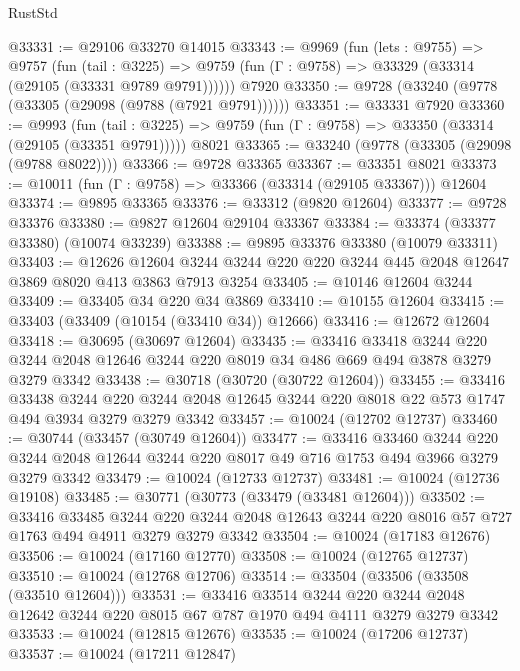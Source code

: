 \begin{lexlean}{RustStd}
\begin{coremodule}
@33331 := @29106 @33270 @14015
@33343 := @9969
    (fun (lets : @9755) =>
    @9757
      (fun (tail : @3225) =>
      @9759 (fun (Γ : @9758) => @33329 (@33314 (@29105 (@33331 @9789 @9791))))))
    @7920
@33350 := @9728 (@33240 (@9778 (@33305 (@29098 (@9788 (@7921 @9791))))))
@33351 := @33331 @7920
@33360 := @9993
    (fun (tail : @3225) => @9759 (fun (Γ : @9758) => @33350 (@33314 (@29105 (@33351 @9791)))))
    @8021
@33365 := @33240 (@9778 (@33305 (@29098 (@9788 @8022))))
@33366 := @9728 @33365
@33367 := @33351 @8021
@33373 := @10011 (fun (Γ : @9758) => @33366 (@33314 (@29105 @33367))) @12604
@33374 := @9895 @33365
@33376 := @33312 (@9820 @12604)
@33377 := @9728 @33376
@33380 := @9827 @12604 @29104 @33367
@33384 := @33374 (@33377 @33380) (@10074 @33239)
@33388 := @9895 @33376 @33380 (@10079 @33311)
@33403 := @12626
    @12604
    @3244
    @3244
    @220
    @220
    @3244
    @445
    @2048
    @12647
    @3869
    @8020
    @413
    @3863
    @7913
    @3254
@33405 := @10146 @12604 @3244
@33409 := @33405 @34 @220 @34 @3869
@33410 := @10155 @12604
@33415 := @33403 (@33409 (@10154 (@33410 @34)) @12666)
@33416 := @12672 @12604
@33418 := @30695 (@30697 @12604)
@33435 := @33416
    @33418
    @3244
    @220
    @3244
    @2048
    @12646
    @3244
    @220
    @8019
    @34
    @486
    @669
    @494
    @3878
    @3279
    @3279
    @3342
@33438 := @30718 (@30720 (@30722 @12604))
@33455 := @33416
    @33438
    @3244
    @220
    @3244
    @2048
    @12645
    @3244
    @220
    @8018
    @22
    @573
    @1747
    @494
    @3934
    @3279
    @3279
    @3342
@33457 := @10024 (@12702 @12737)
@33460 := @30744 (@33457 (@30749 @12604))
@33477 := @33416
    @33460
    @3244
    @220
    @3244
    @2048
    @12644
    @3244
    @220
    @8017
    @49
    @716
    @1753
    @494
    @3966
    @3279
    @3279
    @3342
@33479 := @10024 (@12733 @12737)
@33481 := @10024 (@12736 @19108)
@33485 := @30771 (@30773 (@33479 (@33481 @12604)))
@33502 := @33416
    @33485
    @3244
    @220
    @3244
    @2048
    @12643
    @3244
    @220
    @8016
    @57
    @727
    @1763
    @494
    @4911
    @3279
    @3279
    @3342
@33504 := @10024 (@17183 @12676)
@33506 := @10024 (@17160 @12770)
@33508 := @10024 (@12765 @12737)
@33510 := @10024 (@12768 @12706)
@33514 := @33504 (@33506 (@33508 (@33510 @12604)))
@33531 := @33416
    @33514
    @3244
    @220
    @3244
    @2048
    @12642
    @3244
    @220
    @8015
    @67
    @787
    @1970
    @494
    @4111
    @3279
    @3279
    @3342
@33533 := @10024 (@12815 @12676)
@33535 := @10024 (@17206 @12737)
@33537 := @10024 (@17211 @12847)

\end{coremodule}
\end{lexlean}
